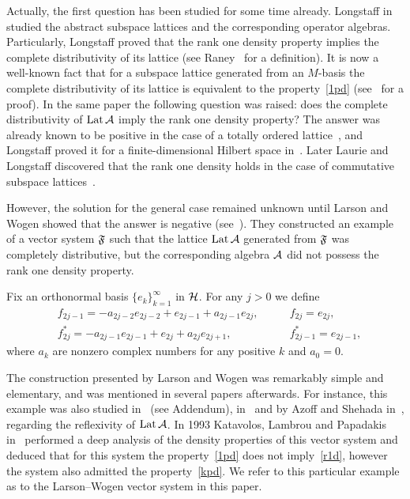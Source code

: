 \documentclass[12pt,oneside,a4paper]{amsart}
\begin{document}
  Actually, the first question has been studied for some time already.
  Long\-staff in~\cite{longstaff} studied the abstract subspace lattices and the corresponding operator algebras.
  Particularly, Longstaff proved that the rank one density property implies
    the complete distributivity of its lattice (see Raney~\cite{raney} for a definition).
  It is now a well-known fact that for a subspace lattice generated from an $M$-basis the complete distributivity of its lattice is equivalent to
    the property~\eqref{1pd} (see~\cite{argyroslambrou} for a proof).
  In the same paper the following question was raised: does the complete distributivity of $\lattice$ imply the rank one density property?
  The answer was already known to be positive in the case of a totally ordered lattice~\cite{erdos}, and
    Longstaff proved it for a finite-dimensional Hilbert space in~\cite{longstaff}.
  Later Laurie and Longstaff discovered that the rank one density holds in the case of commutative subspace lattices~\cite{laurielongstaff}.

  However, the solution for the general case remained unknown until Larson and Wogen showed that the answer is negative (see~\cite{larson}).
  They constructed an example of a vector system $\fsys$ such that the lattice $\lattice$ generated from $\fsys$
    was completely distributive, but the corresponding algebra $\cal{A}$
    did not possess the rank one density property.
  \begin{example}
    \label{lw-sys}
    Fix an orthonormal basis $\{e_k\}_{k=1}^\infty$ in $\cal{H}$. For any $j > 0$ we define
    \begin{align*}
      &f_{2j-1}=-a_{2j-2}e_{2j-2} + e_{2j-1} + a_{2j-1}e_{2j}, \qquad &f_{2j}=e_{2j},\\
      &f^*_{2j}=-a_{2j-1}e_{2j-1}+e_{2j}+a_{2j}e_{2j+1}, \qquad &f^*_{2j-1}=e_{2j-1},
    \end{align*}
    where $a_k$ are nonzero complex numbers for any positive $k$ and $a_0 = 0$.
  \end{example}
  The construction presented by Larson and Wogen was remarkably simple and elementary, and was mentioned in several papers afterwards.
  For instance, this example was also studied in~\cite{argyroslambrou} (see Addendum), in~\cite{me} and by Azoff and Shehada in~\cite{azoff}, regarding
    the reflexivity of $\lattice$.
  In 1993 Katavolos, Lambrou and Papadakis in~\cite{katavolos} performed a deep analysis of the density properties
    of this vector system and deduced that for this system the property~\eqref{1pd} does not imply~\eqref{r1d},
    however the system also admitted the property~\eqref{kpd}.
  We refer to this particular example as to the Larson--Wogen vector system in this paper.
\end{document}
